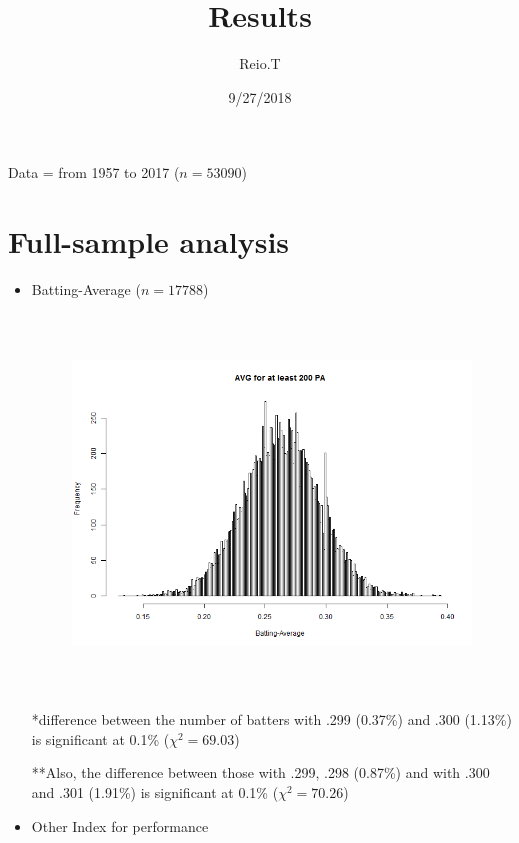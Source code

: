 \documentclass[dvipdfmx]{article}
\begin{document}
\title{Results}
\author{Reio.T}
\date{9/27/2018}
\maketitle

\normalsize
\setlength\intextsep{0pt}

Data = from 1957 to 2017 ($n=53090$)

\section{Full-sample analysis}


\begin{itemize}
  \item Batting-Average
  ($n=17788$)
   \begin{center}

    \begin{figure}[H]
     \centering
     \includegraphics[width = 14cm, height = 10cm]{graphs/AVG_200PA.png}
    \end{figure}


     *difference between the number of batters with .299 (0.37\%)
     and .300 (1.13\%) is significant at 0.1\% ($\chi^2 = 69.03$)

     **Also, the difference between those with .299, .298 (0.87\%)
     and with .300 and .301 (1.91\%) is significant at 0.1\%
     ($\chi^2 = 70.26$)

   \end{center}

  \item Other Index for performance


\end{itemize}
\end{document}
